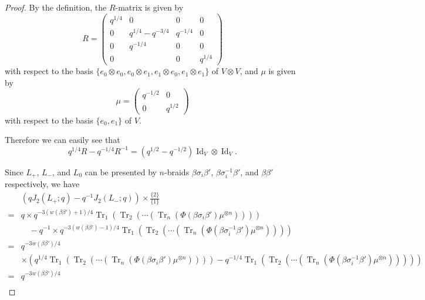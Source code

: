 \documentclass{amsart}
\newcommand{\Id}{\operatorname{Id}}
\newcommand{\Tr}{\operatorname{Tr}}
\theoremstyle{definition}
\theoremstyle{remark}
\numberwithin{equation}{section}
\begin{document}
\begin{proof}
By the definition, the $R$-matrix is given by
\begin{equation*}
  R
  =
  \begin{pmatrix}
    q^{1/4}&0               &0       &0 \\
    0      &q^{1/4}-q^{-3/4}&q^{-1/4}&0 \\
    0      &q^{-1/4}        &0       &0 \\
    0      &                &0       &q^{1/4}
  \end{pmatrix}
\end{equation*}
with respect to the basis $\{e_0\otimes e_0,e_0\otimes e_1,e_1\otimes e_0,e_1\otimes e_1\}$ of $V\otimes V$, and $\mu$ is given by
\begin{equation*}
  \mu
  =
  \begin{pmatrix}
    q^{-1/2}&0 \\
    0       &q^{1/2}
  \end{pmatrix}
\end{equation*}
with respect to the basis $\{e_0,e_1\}$ of $V$.
\par
Therefore we can easily see that
\begin{equation}\label{eq:skein_R}
  q^{1/4}R-q^{-1/4}R^{-1}
  =
  (q^{1/2}-q^{-1/2})\Id_V\otimes\Id_V.
\end{equation}
\par
Since $L_+$, $L_-$, and $L_0$ can be presented by $n$-braids $\beta\sigma_i\beta'$, $\beta\sigma_i^{-1}\beta'$, and $\beta\beta'$ respectively, we have
\begin{equation*}
\begin{split}
  &
  \left(
    qJ_2(L_+;q)
    -
    q^{-1}J_2(L_-;q)
  \right)
  \times\frac{\{2\}}{\{1\}}
  \\
  =&
  q\times
  q^{-3(w(\beta\beta')+1)/4}
  \Tr_1(\Tr_2(\cdots(\Tr_n(\Phi(\beta\sigma_i\beta')\mu^{\otimes n}))))
  \\
  &\quad
  -
  q^{-1}\times
  q^{-3(w(\beta\beta')-1)/4}
  \Tr_1(\Tr_2(\cdots(\Tr_n(\Phi(\beta\sigma_i^{-1}\beta')\mu^{\otimes n}))))
  \\
  =&
  q^{-3w(\beta\beta')/4}
  \\
  &\times
  \left(
    q^{1/4}
    \Tr_1(\Tr_2(\cdots(\Tr_n(\Phi(\beta\sigma_i\beta')\mu^{\otimes n}))))
    -
    q^{-1/4}
    \Tr_1(\Tr_2(\cdots(\Tr_n(\Phi(\beta\sigma_i^{-1}\beta')\mu^{\otimes n}))))
  \right)
  \\
  =&
  q^{-3w(\beta\beta')/4}
  \\

\end{split}
\end{equation*}
\end{proof}
\end{document}
